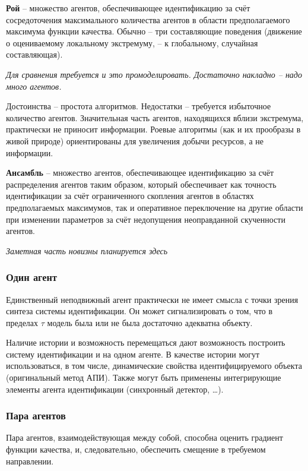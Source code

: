 \documentclass[a4paper,12pt]{article}
\begin{document}
\textbf{ Рой } -- множество агентов, обеспечивающее идентификацию за счёт
сосредоточения максимального количества агентов
в области предполагаемого максимума функции качества.
Обычно -- три составляющие поведения
(движение о оцениваемому локальному экстремуму, -- к глобальному, случайная составляющая).

\textit{Для сравнения требуется и это промоделировать.
Достаточно накладно -- надо много агентов.}

Достоинства -- простота алгоритмов.
Недостатки -- требуется избыточное количество агентов.
Значительная часть агентов, находящихся вблизи экстремума,
практически не приносит информации. Роевые
алгоритмы (как и их прообразы в живой природе) ориентированы
для увеличения добычи ресурсов, а не информации.

\textbf{ Ансамбль } -- множество агентов, обеспечивающее идентификацию за счёт
распределения агентов таким образом, который обеспечивает как
точность идентификации за счёт ограниченного скопления агентов
в областях предполагаемых максимумов, так и оперативное переключение
на другие области при изменении параметров за счёт недопущения
неоправданной скученности агентов.

\textit{ Заметная часть новизны планируется здесь}

\subsubsection{Один агент}

Единственный неподвижный агент практически не имеет смысла
с точки зрения синтеза системы идентификации.
Он может сигнализировать о том, что в пределах
\(\tau\) модель была или не была достаточно адекватна
объекту.

Наличие истории и возможность перемещаться дают возможность
построить систему идентификации и на одном агенте.
В качестве истории могут использоваться, в том числе,
динамические свойства идентифицируемого объекта
(оригинальный метод АПИ). Также могут быть
применены интегрирующие элементы агента идентификации
(синхронный детектор, \ldots).

\subsubsection{Пара агентов}

Пара агентов, взаимодействующая между собой,
способна оценить градиент функции качества,
и, следовательно, обеспечить смещение в требуемом направлении.
\end{document}
